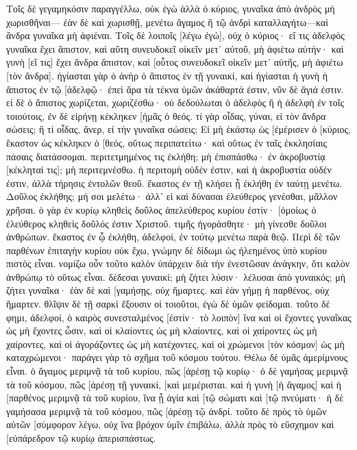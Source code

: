 Τοῖς δὲ γεγαμηκόσιν παραγγέλλω, οὐκ ἐγὼ ἀλλὰ ὁ κύριος, γυναῖκα ἀπὸ ἀνδρὸς μὴ χωρισθῆναι— 
ἐὰν δὲ καὶ χωρισθῇ, μενέτω ἄγαμος ἢ τῷ ἀνδρὶ καταλλαγήτω—καὶ ἄνδρα γυναῖκα μὴ ἀφιέναι. 
Τοῖς δὲ λοιποῖς [λέγω ἐγώ], οὐχ ὁ κύριος· εἴ τις ἀδελφὸς γυναῖκα ἔχει ἄπιστον, καὶ αὕτη συνευδοκεῖ οἰκεῖν μετ᾽ αὐτοῦ, μὴ ἀφιέτω αὐτήν· 
καὶ γυνὴ [εἴ τις] ἔχει ἄνδρα ἄπιστον, καὶ [οὗτος συνευδοκεῖ οἰκεῖν μετ᾽ αὐτῆς, μὴ ἀφιέτω [τὸν ἄνδρα]. 
ἡγίασται γὰρ ὁ ἀνὴρ ὁ ἄπιστος ἐν τῇ γυναικί, καὶ ἡγίασται ἡ γυνὴ ἡ ἄπιστος ἐν τῷ [ἀδελφῷ· ἐπεὶ ἄρα τὰ τέκνα ὑμῶν ἀκάθαρτά ἐστιν, νῦν δὲ ἅγιά ἐστιν. 
εἰ δὲ ὁ ἄπιστος χωρίζεται, χωριζέσθω· οὐ δεδούλωται ὁ ἀδελφὸς ἢ ἡ ἀδελφὴ ἐν τοῖς τοιούτοις, ἐν δὲ εἰρήνῃ κέκληκεν [ἡμᾶς ὁ θεός. 
τί γὰρ οἶδας, γύναι, εἰ τὸν ἄνδρα σώσεις; ἢ τί οἶδας, ἄνερ, εἰ τὴν γυναῖκα σώσεις; 
Εἰ μὴ ἑκάστῳ ὡς [ἐμέρισεν ὁ [κύριος, ἕκαστον ὡς κέκληκεν ὁ [θεός, οὕτως περιπατείτω· καὶ οὕτως ἐν ταῖς ἐκκλησίαις πάσαις διατάσσομαι. 
περιτετμημένος τις ἐκλήθη; μὴ ἐπισπάσθω· ἐν ἀκροβυστίᾳ [κέκληταί τις]; μὴ περιτεμνέσθω. 
ἡ περιτομὴ οὐδέν ἐστιν, καὶ ἡ ἀκροβυστία οὐδέν ἐστιν, ἀλλὰ τήρησις ἐντολῶν θεοῦ. 
ἕκαστος ἐν τῇ κλήσει ᾗ ἐκλήθη ἐν ταύτῃ μενέτω. 
Δοῦλος ἐκλήθης; μή σοι μελέτω· ἀλλ᾽ εἰ καὶ δύνασαι ἐλεύθερος γενέσθαι, μᾶλλον χρῆσαι. 
ὁ γὰρ ἐν κυρίῳ κληθεὶς δοῦλος ἀπελεύθερος κυρίου ἐστίν· [ὁμοίως ὁ ἐλεύθερος κληθεὶς δοῦλός ἐστιν Χριστοῦ. 
τιμῆς ἠγοράσθητε· μὴ γίνεσθε δοῦλοι ἀνθρώπων. 
ἕκαστος ἐν ᾧ ἐκλήθη, ἀδελφοί, ἐν τούτῳ μενέτω παρὰ θεῷ. 
Περὶ δὲ τῶν παρθένων ἐπιταγὴν κυρίου οὐκ ἔχω, γνώμην δὲ δίδωμι ὡς ἠλεημένος ὑπὸ κυρίου πιστὸς εἶναι. 
νομίζω οὖν τοῦτο καλὸν ὑπάρχειν διὰ τὴν ἐνεστῶσαν ἀνάγκην, ὅτι καλὸν ἀνθρώπῳ τὸ οὕτως εἶναι. 
δέδεσαι γυναικί; μὴ ζήτει λύσιν· λέλυσαι ἀπὸ γυναικός; μὴ ζήτει γυναῖκα· 
ἐὰν δὲ καὶ [γαμήσῃς, οὐχ ἥμαρτες. καὶ ἐὰν γήμῃ ἡ παρθένος, οὐχ ἥμαρτεν. θλῖψιν δὲ τῇ σαρκὶ ἕξουσιν οἱ τοιοῦτοι, ἐγὼ δὲ ὑμῶν φείδομαι. 
τοῦτο δέ φημι, ἀδελφοί, ὁ καιρὸς συνεσταλμένος [ἐστίν· τὸ λοιπὸν] ἵνα καὶ οἱ ἔχοντες γυναῖκας ὡς μὴ ἔχοντες ὦσιν, 
καὶ οἱ κλαίοντες ὡς μὴ κλαίοντες, καὶ οἱ χαίροντες ὡς μὴ χαίροντες, καὶ οἱ ἀγοράζοντες ὡς μὴ κατέχοντες, 
καὶ οἱ χρώμενοι [τὸν κόσμον] ὡς μὴ καταχρώμενοι· παράγει γὰρ τὸ σχῆμα τοῦ κόσμου τούτου. 
Θέλω δὲ ὑμᾶς ἀμερίμνους εἶναι. ὁ ἄγαμος μεριμνᾷ τὰ τοῦ κυρίου, πῶς [ἀρέσῃ τῷ κυρίῳ· 
ὁ δὲ γαμήσας μεριμνᾷ τὰ τοῦ κόσμου, πῶς [ἀρέσῃ τῇ γυναικί, 
[καὶ μεμέρισται. καὶ ἡ γυνὴ [ἡ ἄγαμος] καὶ ἡ [παρθένος μεριμνᾷ τὰ τοῦ κυρίου, ἵνα ᾖ ἁγία καὶ [τῷ σώματι καὶ [τῷ πνεύματι· ἡ δὲ γαμήσασα μεριμνᾷ τὰ τοῦ κόσμου, πῶς [ἀρέσῃ τῷ ἀνδρί. 
τοῦτο δὲ πρὸς τὸ ὑμῶν αὐτῶν [σύμφορον λέγω, οὐχ ἵνα βρόχον ὑμῖν ἐπιβάλω, ἀλλὰ πρὸς τὸ εὔσχημον καὶ [εὐπάρεδρον τῷ κυρίῳ ἀπερισπάστως. 

